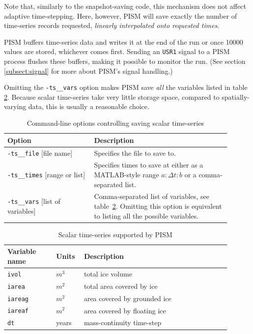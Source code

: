 \documentclass[11pt,final]{amsart}
\newcommand{\und}{\_\!\_}
\newcommand{\pismoptionindex}[1]{\index{options for PISM (and PETSc)!\texttt{-#1}}}
\newcommand{\intextoption}[1]{\texttt{-#1}\pismoptionindex{#1}}
\begin{document}
Note that, similarly to the snapshot-saving code, this mechanism does not affect adaptive time-stepping.  Here, however, PISM will save exactly the number of time-series records requested, \emph{linearly interpolated onto requested times}.

PISM buffers time-series data and writes it at the end of the run or once 10000 values are stored, whichever comes first. Sending an \texttt{USR1} signal to a PISM process flushes these buffers, making it possible to monitor the run. (See section \ref{subsect:signal} for more about PISM's signal handling.)

Omitting the \intextoption{ts\und vars} option makes PISM save \emph{all} the variables listed in table \ref{tab:time-series}.  Because scalar time-series take very little storage space, compared to spatially-varying data, this is usually a reasonable choice.

\begin{table}[ht]
  \caption{Command-line options controlling saving scalar time-series}
  \centering
  \begin{tabular}{p{0.35\linewidth}p{0.55\linewidth}}\hline
    \textbf{Option} & \textbf{Description} \\
    \hline
    \intextoption{ts\und file} [file name] & Specifies the file to save to.\\
    \intextoption{ts\und times} [range or list] & Specifies times to save at either as a MATLAB-style range $a:\Delta t:b$ or a comma-separated list. \\
    \intextoption{ts\und vars} [list of variables] & Comma-separated list of variables, see table~\ref{tab:time-series}. Omitting this option is equivalent to listing all the possible variables.\\
    \hline
  \end{tabular}
 \label{tab:time-series-opts}
\end{table}

\begin{table}[ht]
  \caption{Scalar time-series supported by PISM}
  \centering
  \begin{tabular}{p{0.2\linewidth}p{0.1\linewidth}p{0.6\linewidth}}\hline
   \textbf{Variable name} & \textbf{Units} & \textbf{Description}\\
   \hline
    \texttt{ivol} & $m^{3}$ & total ice volume\\
    \texttt{iarea} & $m^{2}$ & total area covered by ice \\
    \texttt{iareag} & $m^{2}$ & area covered by grounded ice\\
    \texttt{iareaf} & $m^{2}$ & area covered by floating ice\\
    \texttt{dt} & years & mass-continuity time-step\\
    \hline
  \end{tabular}
 \label{tab:time-series}
\end{table}
\end{document}
